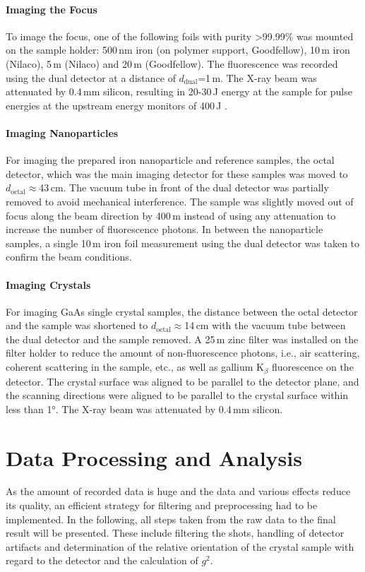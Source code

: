 \paragraph{Imaging the Focus}
To image the focus, one of the following foils with purity >99.99\% was mounted on the sample holder: 500\,nm iron (on polymer support, Goodfellow), 10\,\textmu m iron (Nilaco), 5\,\textmu m (Nilaco) and 20\,\textmu m (Goodfellow). The fluorescence was recorded using the dual detector at a distance of $d_\text{dual}$=1\,m.
The X-ray beam was attenuated by 0.4\,mm silicon, resulting in 20-30\,\textmu J  energy at the sample for pulse energies at the upstream energy monitors of 400\,\textmu J \cite{yabashi2015,tono2013}.
\paragraph{Imaging Nanoparticles}
For imaging the prepared iron nanoparticle and reference samples, the octal detector, which was the main imaging detector for these samples was moved to $d_\text{octal}\approx$43\,cm. The vacuum tube in front of the dual detector was partially removed to avoid mechanical interference. The sample was slightly moved out of focus along the beam direction by 400\,\textmu m instead of using any attenuation to increase the number of fluorescence photons. In between the nanoparticle samples, a single 10\,\textmu m iron foil measurement using the dual detector was taken to confirm the beam conditions.

\paragraph{Imaging Crystals}
For imaging GaAs single crystal samples, the distance between the octal detector and the sample was shortened to $d_\text{octal}\approx$14\,cm with the vacuum tube between the dual detector and the sample removed. A 25\,\textmu m zinc filter was installed on the filter holder to reduce the amount of non-fluorescence photons, i.e., air scattering, coherent scattering in the sample, etc., as well as gallium K$_\beta$ fluorescence on the detector. The crystal surface was aligned to be parallel to the detector plane, and the scanning directions were aligned to be parallel to the crystal surface within less than 1°. The X-ray beam was attenuated by 0.4\,mm silicon.

\section{Data Processing and Analysis}
As the amount of recorded data is huge and the data and various effects reduce its quality, an efficient strategy for filtering and preprocessing had to be implemented. In the following, all steps taken from the raw data to the final result will be presented. These include filtering the shots, handling of detector artifacts and determination of the relative orientation of the crystal sample with regard to the detector and the calculation of $g^2$.
